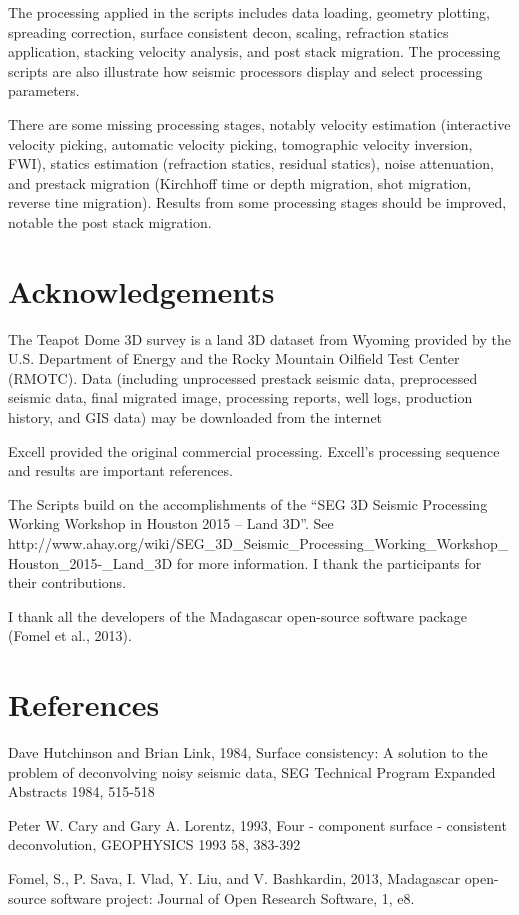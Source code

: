 The processing applied in the scripts includes data loading, geometry plotting, spreading correction, surface consistent decon, scaling, refraction statics application, stacking velocity analysis, and post stack migration.  The processing scripts are also illustrate how seismic processors display and select processing parameters. 

There are some missing processing stages, notably velocity estimation (interactive velocity picking, automatic velocity picking, tomographic velocity inversion, FWI), statics estimation (refraction statics, residual statics), noise attenuation, and prestack migration (Kirchhoff time or depth migration, shot migration, reverse tine migration).  Results from some processing stages should be improved, notable the post stack migration.

\section{Acknowledgements} 

The Teapot Dome 3D survey is a land 3D dataset from Wyoming provided by the U.S. Department of Energy and the Rocky Mountain Oilfield Test Center (RMOTC).  Data (including unprocessed prestack seismic data, preprocessed seismic data, final migrated image, processing reports, well logs, production history, and GIS data) may be downloaded from the internet

Excell provided the original commercial processing.  Excell’s processing sequence and results are important references.

The Scripts build on the accomplishments of the “SEG 3D Seismic Processing Working Workshop in Houston 2015 – Land 3D”.  See http://www.ahay.org/wiki/SEG\_3D\_Seismic\_Processing\_Working\_Workshop\_Houston\_2015-\_Land\_3D for more information.  I thank the participants for their contributions.

I thank all the developers of the Madagascar open-source software package (Fomel et al., 2013).

\section{References}

Dave Hutchinson and Brian Link, 1984, Surface consistency: A solution to the problem of deconvolving noisy seismic data,  SEG Technical Program Expanded Abstracts 1984, 515-518 

 Peter W. Cary and Gary A. Lorentz, 1993, Four - component surface - consistent deconvolution, GEOPHYSICS 1993 58, 383-392 

Fomel, S., P. Sava, I. Vlad, Y. Liu, and V. Bashkardin, 2013, Madagascar open-source software project: Journal of Open Research Software, 1, e8. 


